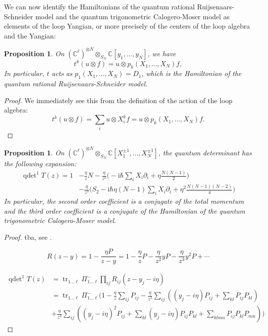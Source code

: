 \documentclass[11pt]{report}
\newtheorem{prop}[theorem]{Proposition}
\theoremstyle{definition}
\theoremstyle{remark}
\theoremstyle{remark}
\newcommand{\C}{\mathbb{C}}
\newcommand{\I}{\mathrm{i}}
\begin{document}
We can now identify the Hamiltonians of the quantum rational Ruijsenaars-Schneider model and the quantum trigonometric Calogero-Moser model as elements of the loop Yangian, or more precisely of the centers of the loop algebra and the Yangian:

\begin{prop}
On $(\C^\ell)^{\otimes N} \otimes_{S_N} \C[y_1,...,y_N]$, we have
\begin{equation*}
t^k(u \otimes f) = u \otimes p_k(X_1,...,X_N) f,
\end{equation*}
In particular, $t$ acts as $p_1(X_1,...,X_N) = D_1$, which is the Hamiltonian of the quantum rational Ruijsenaars-Schneider model.
\end{prop}

\begin{proof}
We immediately see this from the definition of the action of the loop algebra:
\begin{equation*}
t^k(u \otimes f) = \sum_i u \otimes X_i^k f = u \otimes p_k(X_1,...,X_N) f.
\end{equation*}
\end{proof}

\begin{prop}
On $(\C^\ell)^{\otimes N} \otimes_{S_N} \C[X_1^{\pm 1},...,X_N^{\pm 1}]$, the quantum determinant has the following expansion:
\begin{align*}
\operatorname{qdet}^1 T(z)
= 1 &- \frac{\eta}{z} N - \frac{\eta}{z^2} \bigg( -\I \hbar \sum_i X_i \partial_i + \eta \frac{N(N-1)}{2} \bigg) \\
&- \frac{\eta}{z^3} \bigg( S_2 - \I \hbar \eta (N-1) \sum_i X_i \partial_i + \eta^2 \frac{N(N-1)(N-2)}{4} \bigg)
\end{align*}
In particular, the second order coefficient is a conjugate of the total momentum and the third order coefficient is a conjugate of the Hamiltonian of the quantum trigonometric Calogero-Moser model.
\end{prop}

\begin{proof}
tba, see \cite{article:bernard:1993}.

\begin{equation*}
R(z-y) = 1 - \frac{\eta P}{z-y} = 1 - \frac{\eta}{z} P - \frac{\eta}{z^2} y P - \frac{\eta}{z^3} y^2 P + \cdots
\end{equation*}

\begin{align*}
\operatorname{qdet}^1 T(z)
&= \operatorname{tr}_{1...\ell} \Pi_{1...\ell}^- \prod_{ij} R_{ij}(z-y_j-i\eta) \\
&= \operatorname{tr}_{1...\ell} \Pi_{1...\ell}^- ( 1
- \frac{\eta}{z} \sum_{ij} P_{ij}
- \frac{\eta}{z^2} \sum_{ij} \left( (y_j-i\eta) P_{ij} + \sum_{kl} P_{ij} P_{kl} \right) \\
&+ \frac{\eta}{z^3} \sum_{ij} \left( (y_j-i\eta)^2 P_{ij} + \sum_{kl} (y_j-i\eta) P_{ij} P_{kl} + \sum_{klmn} P_{ij} P_{kl} P_{mn} \right) )
\end{align*}
\end{proof}
\end{document}
